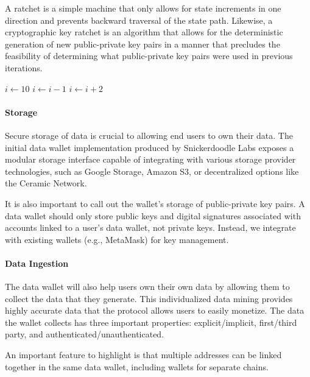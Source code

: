 A ratchet is a simple machine that only allows for state increments in one direction and prevents backward traversal of the state path. Likewise, a cryptographic
key ratchet is an algorithm that allows for the deterministic generation of new public-private key pairs in a manner that precludes the feasibility of determining
what public-private key pairs were used in previous iterations. 

\begin{algorithmic}
  \State $i \gets 10$
      \State $i \gets i-1$
  \Else
          \State $i \gets i+2$
      \EndIf
  \EndIf 
\end{algorithmic}

\paragraph{Storage}
\label{section:storage}

Secure storage of data is crucial to allowing end users to own their data. The initial data wallet implementation produced by 
Snickerdoodle Labs exposes a modular storage interface capable of integrating with various storage provider technologies, 
such as Google Storage, Amazon S3, or decentralized options like the Ceramic Network.

It is also important to call out the wallet's storage of public-private key pairs. A data wallet should only store public keys 
and digital signatures associated with accounts linked to a user's data wallet, not private keys. 
Instead, we integrate with existing wallets (e.g., MetaMask) for key management.

\paragraph{Data Ingestion}
\label{section:DataIngestion}
The data wallet will also help users own their own data by allowing them to collect the data that they generate. This individualized data mining 
provides highly accurate data that the protocol allows users to easily monetize. The data the wallet collects has three important properties: 
explicit/implicit, first/third party, and authenticated/unauthenticated. %

An important feature to highlight is that multiple addresses can be linked together in the same data wallet, including wallets for separate chains. 

